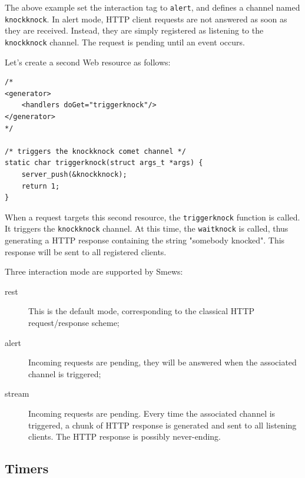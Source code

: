 \documentclass{report}
\begin{document}
The above example set the interaction tag to \verb+alert+, and defines a channel named \verb+knockknock+. In alert mode, HTTP client requests are not answered as soon as they are received. Instead, they are simply registered as listening to the \verb+knockknock+ channel. The request is pending until an event occurs.

Let's create a second Web resource as follows: 
\lstset{language=C}
\begin{lstlisting}
/*
<generator>
    <handlers doGet="triggerknock"/>
</generator>
*/

/* triggers the knockknock comet channel */
static char triggerknock(struct args_t *args) {
    server_push(&knockknock);
    return 1;
}

\end{lstlisting}

When a request targets this second resource, the \verb+triggerknock+ function is called. It triggers the \verb+knockknock+ channel. At this time, the \verb+waitknock+ is called, thus generating a HTTP response containing the string "somebody knocked". This response will be sent to all registered clients.

Three interaction mode are supported by Smews:
\begin{description}
\item[rest] This is the default mode, corresponding to the classical HTTP request/response scheme;
\item[alert] Incoming requests are pending, they will be answered when the associated channel is triggered;
\item[stream] Incoming requests are pending. Every time the associated channel is triggered, a chunk of HTTP response is generated and sent to all listening clients. The HTTP response is possibly never-ending.
\end{description}

\subsection{Timers}
\end{document}
